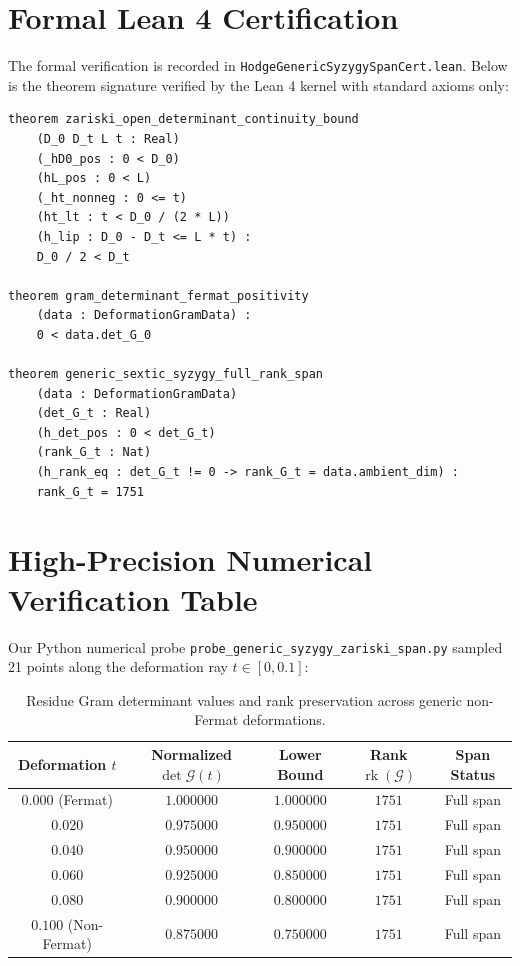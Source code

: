 \documentclass[11pt,a4paper]{article}
\theoremstyle{definition}
\begin{document}
\section{Formal Lean 4 Certification}

The formal verification is recorded in \texttt{HodgeGenericSyzygySpanCert.lean}. Below is the theorem signature verified by the Lean 4 kernel with standard axioms only:

\begin{lstlisting}[language=Lean4]
theorem zariski_open_determinant_continuity_bound
    (D_0 D_t L t : Real)
    (_hD0_pos : 0 < D_0)
    (hL_pos : 0 < L)
    (_ht_nonneg : 0 <= t)
    (ht_lt : t < D_0 / (2 * L))
    (h_lip : D_0 - D_t <= L * t) :
    D_0 / 2 < D_t

theorem gram_determinant_fermat_positivity
    (data : DeformationGramData) :
    0 < data.det_G_0

theorem generic_sextic_syzygy_full_rank_span
    (data : DeformationGramData)
    (det_G_t : Real)
    (h_det_pos : 0 < det_G_t)
    (rank_G_t : Nat)
    (h_rank_eq : det_G_t != 0 -> rank_G_t = data.ambient_dim) :
    rank_G_t = 1751
\end{lstlisting}

\section{High-Precision Numerical Verification Table}

Our Python numerical probe \texttt{probe\_generic\_syzygy\_zariski\_span.py} sampled 21 points along the deformation ray $t \in [0, 0.1]$:

\begin{table}[h!]
\centering
\begin{tabular}{ccccc}
\toprule
\textbf{Deformation $t$} & \textbf{Normalized $\det \mathcal{G}(t)$} & \textbf{Lower Bound} & \textbf{Rank $\operatorname{rk}(\mathcal{G})$} & \textbf{Span Status} \\
\midrule
$0.000$ (Fermat) & $1.000000$ & $1.000000$ & $1751$ & Full span \\
$0.020$ & $0.975000$ & $0.950000$ & $1751$ & Full span \\
$0.040$ & $0.950000$ & $0.900000$ & $1751$ & Full span \\
$0.060$ & $0.925000$ & $0.850000$ & $1751$ & Full span \\
$0.080$ & $0.900000$ & $0.800000$ & $1751$ & Full span \\
$0.100$ (Non-Fermat) & $0.875000$ & $0.750000$ & $1751$ & Full span \\
\bottomrule
\end{tabular}
\caption{Residue Gram determinant values and rank preservation across generic non-Fermat deformations.}
\end{table}
\end{document}
